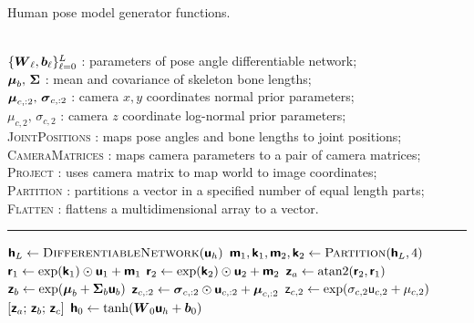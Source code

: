 \begin{algorithm}
\caption{Human pose model generator functions.}
\label{alg:pose-model-generators}
\begin{algorithmic}
\small
    \Require\\
    $\lbrace \boldsymbol{W}_\ell, \boldsymbol{b}_\ell \rbrace_{\ell=0}^L$ : parameters of pose angle differentiable network;\\
    $\boldsymbol{\mu}_b,\,\boldsymbol{\Sigma}$ : mean and covariance of skeleton bone lengths;\\
    $\boldsymbol{\mu}_{c,:2},\,\boldsymbol{\sigma}_{c,:2}$ : camera $x,y$ coordinates normal prior parameters;\\
    $\mu_{c,2},\,\sigma_{c,2}$ : camera $z$ coordinate log-normal prior parameters;\\
    \textsc{JointPositions} : maps pose angles and bone lengths to joint positions;\\
    \textsc{CameraMatrices} : maps camera parameters to a pair of camera matrices;\\
    \textsc{Project} : uses camera matrix to map world  to image coordinates; \\ 
    \textsc{Partition} : partitions a vector in a specified number of equal length parts; \\
    \textsc{Flatten} : flattens a multidimensional array to a vector. \\
\end{algorithmic}
\vspace{-1mm}
\hrule
\vspace{1mm}
\small
\begin{algorithmic}
  \State $\rvct{h}_L \gets \Call{DifferentiableNetwork}{\rvct{u}_h}$
  \State $\rvct{m}_1,\rvct{k}_1,\rvct{m}_2,\rvct{k}_2 \gets \Call{Partition}{\rvct{h}_L, 4}$
  \State $\boldsymbol{\mathsf{r}}_1 \gets \exp(\boldsymbol{\mathsf{k}}_1) \odot \boldsymbol{\mathsf{u}}_1 + \boldsymbol{\mathsf{m}}_1$
  \State $\boldsymbol{\mathsf{r}}_2 \gets \exp(\boldsymbol{\mathsf{k}}_2) \odot \boldsymbol{\mathsf{u}}_2 + \boldsymbol{\mathsf{m}}_2$
  \State $\boldsymbol{\mathsf{z}}_a \gets \textrm{atan2}(\boldsymbol{\mathsf{r}}_2, \boldsymbol{\mathsf{r}}_1)$
  \State $\rvct{z}_b \gets \exp\lpa \vct{\mu}_b + \mtx{\Sigma}_b \rvct{u}_b\rpa$
  \State $\boldsymbol{\mathsf{z}}_{c,:2} \gets \boldsymbol{\sigma}_{c,:2} \odot \boldsymbol{\mathsf{u}}_{c,:2} + \boldsymbol{\mu}_{c,:2}$
  \State $\rvar{z}_{c,2} \gets \exp\lpa \sigma_{c,2}  \rvar{u}_{c,2} + \mu_{c,2} \rpa$
  \State \Return $[\boldsymbol{\mathsf{z}}_a;\,\boldsymbol{\mathsf{z}}_b;\,\boldsymbol{\mathsf{z}}_c]$
\EndFunction
{}
  \State $\rvct{h}_0 \gets \tanh\lpa\mtx{W}_0 \rvct{u}_h + \vct{b}_0\rpa$

\end{algorithmic}
\end{algorithm}
